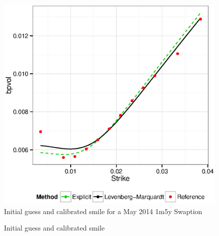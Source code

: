 \documentclass[]{rAMF2e}
\begin{document}
\begin{figure}[h!]
  \caption{\label{fig:explicit_fit_1m_beta05}Initial guess and calibrated smile for a May 2014 1m5y Swaption }
\begin{center}
 \includegraphics[width=11.5cm]{explicit_fit_1m_beta05.eps}
\end{center}
\end{figure}
\begin{figure}[h!]
  \begin{center}  
  \end{center}
     \caption{Initial guess and calibrated smile}
\end{figure}
\end{document}
